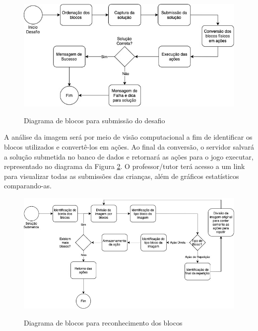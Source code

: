     \begin{figure}[H]
        \caption{Diagrama de blocos para submissão do desafio}
        \centering
        \includegraphics[width=\linewidth]{Imagens/Cap3/Blocos Desafio.jpg}
        \label{figura:blocos_desafio}
    \end{figure}
    
    A análise da imagem será por meio de visão computacional a fim de identificar os blocos utilizados e convertê-los em ações. Ao final da conversão, o servidor salvará a solução submetida no banco de dados e retornará as ações para o jogo executar, representado no diagrama da Figura \ref{figura:blocos_reconhecimento}. O professor/tutor terá acesso a um link para visualizar todas as submissões das crianças, além de gráficos estatísticos comparando-as.
    
    \begin{figure}[H]
        \caption{Diagrama de blocos para reconhecimento dos blocos}
        \centering
        \includegraphics[width=\linewidth]{Imagens/Cap3/Blocos Reconhecimento.jpg}
        \label{figura:blocos_reconhecimento}
    \end{figure}
    

